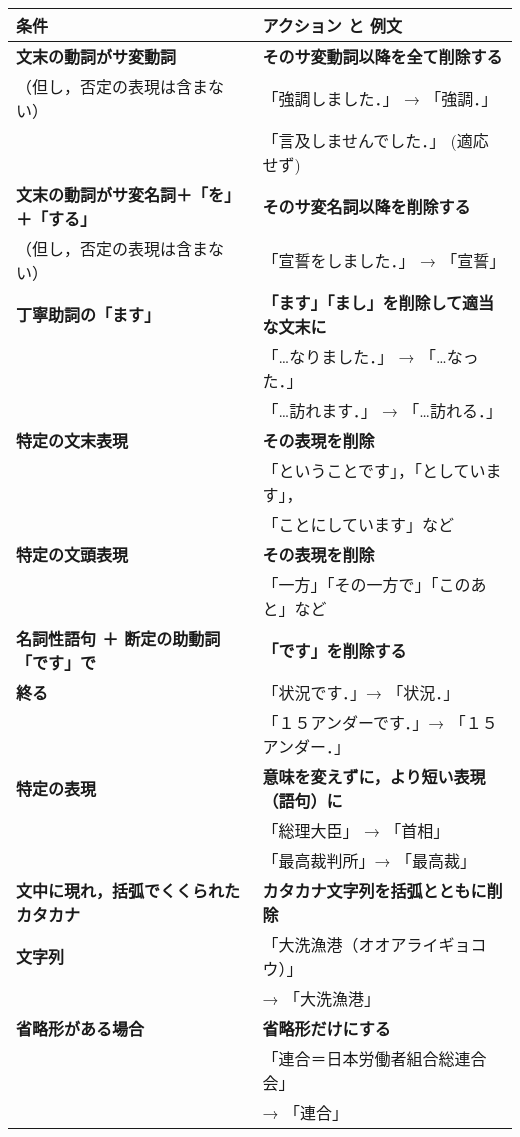 \clearpage


\appendix

\renewcommand{\arraystretch}{}
\begin{tabular}{|p{6.3cm}|p{6.5cm}|} \hline
{\bf 条件} & {\bf アクション と 例文}\\ \hline
{\bf 文末の動詞がサ変動詞} & {\bf そのサ変動詞以降を全て削除する}\\
（但し，否定の表現は含まない） & 「強調しました．」  →   「強調．」\\
& 「言及しませんでした．」  (適応せず)\\ \hline
{\bf 文末の動詞がサ変名詞＋「を」＋「する」} & {\bf そのサ変名詞以降を削除する}\\
（但し，否定の表現は含まない） & 「宣誓をしました．」  →  「宣誓」\\ \hline
{\bf 丁寧助詞の「ます」} & {\bf 「ます」「まし」を削除して適当な文末に}\\
& 「…なりました．」  →  「…なった．」\\
& 「…訪れます．」 →  「…訪れる．」\\ \hline
{\bf 特定の文末表現} & {\bf その表現を削除}\\
& 「ということです」，「としています」，\\
& 「ことにしています」など\\ \hline
{\bf 特定の文頭表現} & {\bf その表現を削除}\\
& 「一方」「その一方で」「このあと」など\\ \hline
{\bf 名詞性語句 ＋ 断定の助動詞「です」で} & {\bf 「です」を削除する}\\
{\bf 終る} & 「状況です．」→  「状況．」\\
& 「１５アンダーです．」→ 「１５アンダー．」\\ \hline
{\bf 特定の表現} & {\bf 意味を変えずに，より短い表現（語句）に}\\
& 「総理大臣」 → 「首相」\\
& 「最高裁判所」→ 「最高裁」\\ \hline
{\bf 文中に現れ，括弧でくくられたカタカナ} & {\bf カタカナ文字列を括弧とともに削除}\\
{\bf 文字列} & 「大洗漁港（オオアライギョコウ）」\\
 & →  「大洗漁港」\\ \hline
{\bf 省略形がある場合} & {\bf 省略形だけにする}\\
& 「連合＝日本労働者組合総連合会」\\
&→ 「連合」\\ \hline

\end{tabular}
